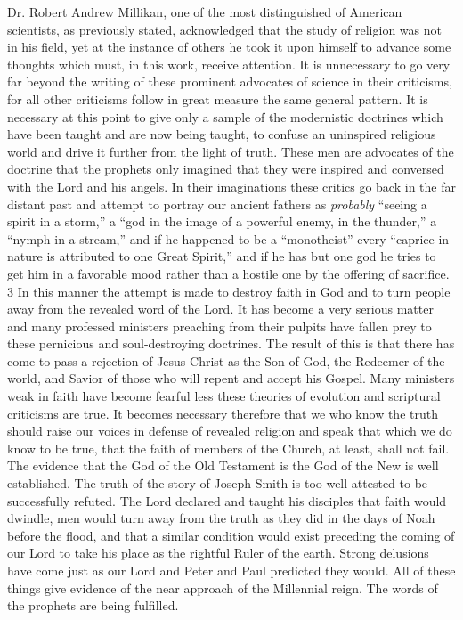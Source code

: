 Dr. Robert Andrew Millikan, one of the most distinguished of American scientists, as
previously stated, acknowledged that the study of religion was not in his field, yet at the
instance of others he took it upon himself to advance some thoughts which must, in this
work, receive attention. It is unnecessary to go very far beyond the writing of these
prominent advocates of science in their criticisms, for all other criticisms follow in great
measure the same general pattern. It is necessary at this point to give only a sample of the
modernistic doctrines which have been taught and are now being taught, to confuse an
uninspired religious world and drive it further from the light of truth. These men are
advocates of the doctrine that the prophets only imagined that they were inspired and
conversed with the Lord and his angels. In their imaginations these critics go back in the far
distant past and attempt to portray our ancient fathers as \textit{probably} ``seeing a spirit in a storm,''
a ``god in the image of a powerful enemy, in the thunder,'' a ``nymph in a stream,'' and if he
happened to be a ``monotheist'' every ``caprice in nature is attributed to one Great Spirit,'' and
if he has but one god he tries to get him in a favorable mood rather than a hostile one by the
offering of sacrifice. 3 In this manner the attempt is made to destroy faith in God and to turn
people away from the revealed word of the Lord. It has become a very serious matter and
many professed ministers preaching from their pulpits have fallen prey to these pernicious
and soul-destroying doctrines. The result of this is that there has come to pass a rejection of
Jesus Christ as the Son of God, the Redeemer of the world, and Savior of those who will
repent and accept his Gospel. Many ministers weak in faith have become fearful less these
theories of evolution and scriptural criticisms are true. It becomes necessary therefore that we
who know the truth should raise our voices in defense of revealed religion and speak that
which we do know to be true, that the faith of members of the Church, at least, shall not fail.
The evidence that the God of the Old Testament is the God of the New is well established.
The truth of the story of Joseph Smith is too well attested to be successfully refuted. The
Lord declared and taught his disciples that faith would dwindle, men would turn away from
the truth as they did in the days of Noah before the flood, and that a similar condition would
exist preceding the coming of our Lord to take his place as the rightful Ruler of the earth.
Strong delusions have come just as our Lord and Peter and Paul predicted they would. All of
these things give evidence of the near approach of the Millennial reign. The words of the
prophets are being fulfilled.

